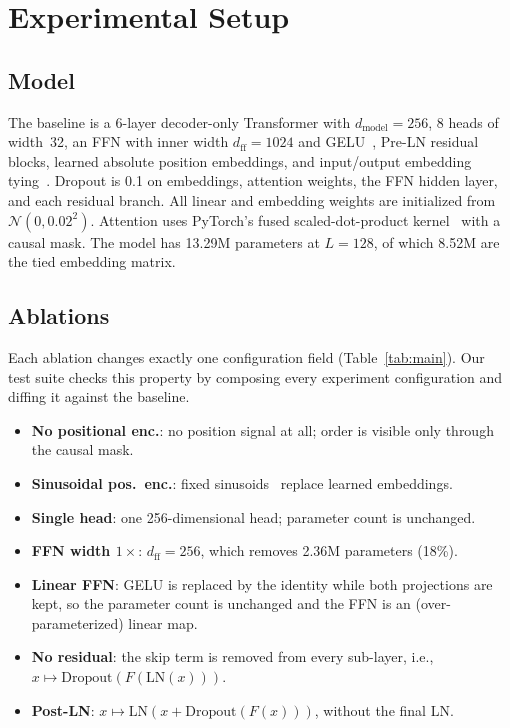 \documentclass[conference]{IEEEtran}
\begin{document}
\section{Experimental Setup}

\subsection{Model}
The baseline is a 6-layer decoder-only Transformer with $d_\text{model}=256$, 8 heads of width~32,
an FFN with inner width $d_\text{ff}=1024$ and GELU~\cite{hendrycks2016gelu}, Pre-LN residual
blocks, learned absolute position embeddings, and input/output embedding
tying~\cite{press2017using}. Dropout is 0.1 on embeddings, attention weights, the FFN hidden layer,
and each residual branch. All linear and embedding weights are initialized from
$\mathcal{N}(0,0.02^2)$. Attention uses PyTorch's fused scaled-dot-product kernel~\cite{dao2022flashattention}
with a causal mask. The model has 13.29M parameters at $L{=}128$, of which 8.52M are the tied
embedding matrix.

\subsection{Ablations}
Each ablation changes exactly one configuration field (Table~\ref{tab:main}). Our test suite
checks this property by composing every experiment configuration and diffing it against the baseline.
\begin{itemize}
\item \textbf{No positional enc.}: no position signal at all; order is visible only through the causal mask.
\item \textbf{Sinusoidal pos.\ enc.}: fixed sinusoids~\cite{vaswani2017attention} replace learned embeddings.
\item \textbf{Single head}: one 256-dimensional head; parameter count is unchanged.
\item \textbf{FFN width $1\times$}: $d_\text{ff}=256$, which removes 2.36M parameters (18\%).
\item \textbf{Linear FFN}: GELU is replaced by the identity while both projections are kept, so
  the parameter count is unchanged and the FFN is an (over-parameterized) linear map.
\item \textbf{No residual}: the skip term is removed from every sub-layer, i.e., $x\mapsto\mathrm{Dropout}(F(\mathrm{LN}(x)))$.
\item \textbf{Post-LN}: $x\mapsto\mathrm{LN}(x+\mathrm{Dropout}(F(x)))$, without the final LN.
\end{itemize}
\end{document}
